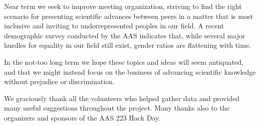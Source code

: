 \documentclass[iop]{emulateapj}
\begin{document}
Near term we seek to improve meeting organization, striving to find the right scenario for presenting scientific advances between peers in a matter that is most inclusive and inviting to underrepresented peoples in our field. A recent demographic survey conducted by the AAS indicates that, while several major hurdles for equality in our field still exist, gender ratios are flattening with time.

In the not-too long term we hope these topics and ideas will seem antiquated, and that we might instead focus on the business of advancing scientific knowledge without prejudice or discrimination. 






\acknowledgements
We graciously thank all the volunteers who helped gather data and provided many useful suggestions throughout the project. Many thanks also to the organizers and sponsors of the AAS 223 Hack Day.
\end{document}

